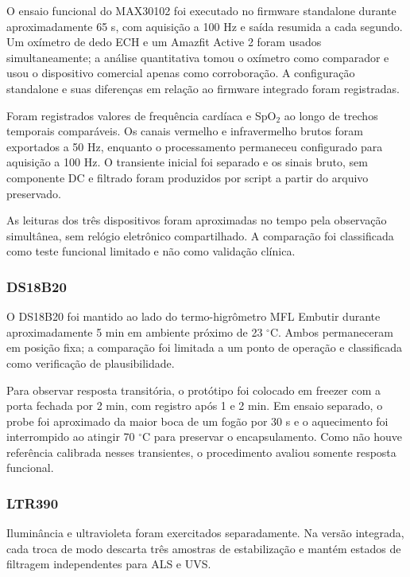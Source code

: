 \documentclass[a4paper,12pt]{article}
\begin{document}
O ensaio funcional do MAX30102 foi executado no firmware standalone durante aproximadamente 65 s, com aquisi\c{c}\~ao a 100 Hz e sa\'ida resumida a cada segundo. Um ox\'imetro de dedo ECH e um Amazfit Active 2 foram usados simultaneamente; a an\'alise quantitativa tomou o ox\'imetro como comparador e usou o dispositivo comercial apenas como corrobora\c{c}\~ao. A configura\c{c}\~ao standalone e suas diferen\c{c}as em rela\c{c}\~ao ao firmware integrado foram registradas.


Foram registrados valores de frequ\^encia card\'iaca e SpO$_2$ ao longo de trechos temporais compar\'aveis. Os canais vermelho e infravermelho brutos foram exportados a 50 Hz, enquanto o processamento permaneceu configurado para aquisi\c{c}\~ao a 100 Hz. O transiente inicial foi separado e os sinais bruto, sem componente DC e filtrado foram produzidos por script a partir do arquivo preservado.


As leituras dos tr\^es dispositivos foram aproximadas no tempo pela observa\c{c}\~ao simult\^anea, sem rel\'ogio eletr\^onico compartilhado. A compara\c{c}\~ao foi classificada como teste funcional limitado e n\~ao como valida\c{c}\~ao cl\'inica.


\subsubsection{DS18B20}

O DS18B20 foi mantido ao lado do termo-higr\^ometro MFL Embutir durante aproximadamente 5 min em ambiente pr\'oximo de 23 $^\circ$C. Ambos permaneceram em posi\c{c}\~ao fixa; a compara\c{c}\~ao foi limitada a um ponto de opera\c{c}\~ao e classificada como verifica\c{c}\~ao de plausibilidade.


Para observar resposta transit\'oria, o prot\'otipo foi colocado em freezer com a porta fechada por 2 min, com registro ap\'os 1 e 2 min. Em ensaio separado, o probe foi aproximado da maior boca de um fog\~ao por 30 s e o aquecimento foi interrompido ao atingir 70 $^\circ$C para preservar o encapsulamento. Como n\~ao houve refer\^encia calibrada nesses transientes, o procedimento avaliou somente resposta funcional.


\subsubsection{LTR390}


Ilumin\^ancia e ultravioleta foram exercitados separadamente. Na vers\~ao integrada, cada troca de modo descarta tr\^es amostras de estabiliza\c{c}\~ao e mant\'em estados de filtragem independentes para ALS e UVS.
\end{document}
